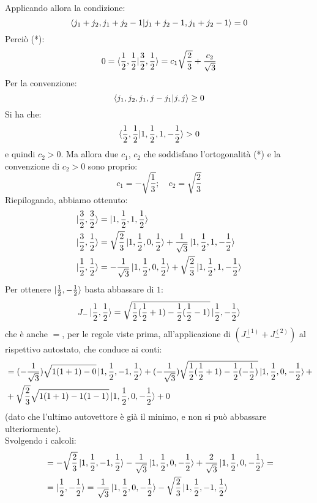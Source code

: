 \documentclass[../../FisicaTeorica.tex]{subfiles}
\begin{document}
\begin{enumerate}
Applicando allora la condizione:
\[
\braket{j_1+j_2, j_1+j_2-1| j_1 + j_2-1, j_1+j_2-1} = 0
\]
Perciò (*):
\begin{align*}
0 = \braket{\frac{1}{2},\frac{1}{2}|\frac{3}{2},\frac{1}{2}} = c_1 \sqrt{\frac{2}{3}}+\frac{c_2}{\sqrt{3}}
\end{align*}
Per la convenzione:
\[
\braket{j_1, j_2, j_1, j-j_1 | j, j} \geq 0
\]
Si ha che:
\[
\braket{\frac{1}{2},\frac{1}{2}|1,\frac{1}{2},1,-\frac{1}{2}} > 0
\]
e quindi $c_2 > 0$. Ma allora due $c_1$, $c_2$ che soddisfano l'ortogonalità (*) e la convenzione di $c_2 > 0$ sono proprio:
\[
c_1 = -\sqrt{\frac{1}{3}}; \quad c_2 = \sqrt{\frac{2}{3}}
\]
Riepilogando, abbiamo ottenuto:
\begin{align*}
\ket{\frac{3}{2},\frac{3}{2}} &= \ket{1,\frac{1}{2},1,\frac{1}{2}}\\
\ket{\frac{3}{2},\frac{1}{2}} &= \sqrt{\frac{2}{3}}\ket{1,\frac{1}{2},0,\frac{1}{2}}+\frac{1}{\sqrt{3}}\ket{1,\frac{1}{2},1,-\frac{1}{2}}\\
\ket{\frac{1}{2},\frac{1}{2}} &= -\frac{1}{\sqrt{3}}\ket{1,\frac{1}{2},0,\frac{1}{2}}+\sqrt{\frac{2}{3}}\ket{1,\frac{1}{2},1,-\frac{1}{2}}
\end{align*}
Per ottenere $\ket{\frac{1}{2},-\frac{1}{2}}$ basta abbassare di $1$:
\[
J_- \ket{\frac{1}{2},\frac{1}{2}}=\sqrt{\frac{1}{2}(\frac{1}{2}+1)-\frac{1}{2}(\frac{1}{2}-1)} \ket{\frac{1}{2},-\frac{1}{2}}
\]
che è anche $=$, per le regole viste prima, all'applicazione di $(J_-^{(1)}+J_-^{(2)})$ al rispettivo autostato, che conduce ai conti:
\begin{align*}
&= (-\frac{1}{\sqrt{3}})\sqrt{1(1+1)-0}\ket{1,\frac{1}{2},-1,\frac{1}{2}} + (-\frac{1}{\sqrt{3}})\sqrt{\frac{1}{2}(\frac{1}{2}+1)-\frac{1}{2}(-\frac{1}{2})}\ket{1,\frac{1}{2},0,-\frac{1}{2}}+\\
&+ \sqrt{\frac{2}{3}}\sqrt{1(1+1)-1(1-1)}\ket{1,\frac{1}{2},0,-\frac{1}{2}} + 0
\end{align*}
(dato che l'ultimo autovettore è già il minimo, e non si può abbassare ulteriormente).\\
Svolgendo i calcoli:
\begin{align*}
&=
-\sqrt{\frac{2}{3}}\ket{1,\frac{1}{2},-1,\frac{1}{2}} -\frac{1}{\sqrt{3}}\ket{1,\frac{1}{2},0,-\frac{1}{2}} + \frac{2}{\sqrt{3}}\ket{1,\frac{1}{2},0,-\frac{1}{2}} =\\
&=\ket{\frac{1}{2},-\frac{1}{2}} = \frac{1}{\sqrt{3}}\ket{1,\frac{1}{2},0,-\frac{1}{2}}-\sqrt{\frac{2}{3}}\ket{1,\frac{1}{2},-1,\frac{1}{2}}
\end{align*}

\end{enumerate}
\end{document}
